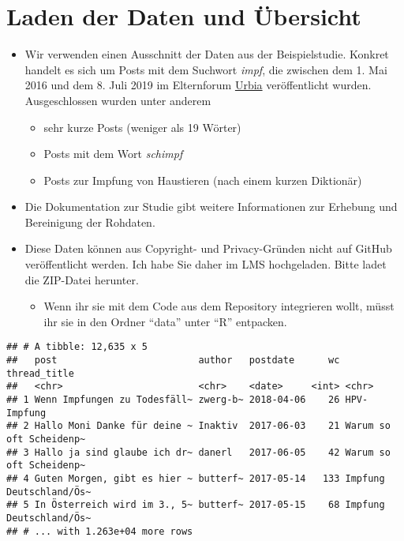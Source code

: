 \documentclass[
]{book}
\newenvironment{Shaded}{\begin{snugshade}}{\end{snugshade}}
\newcommand{\CommentTok}[1]{\textcolor[rgb]{0.56,0.35,0.01}{\textit{#1}}}
\newcommand{\DataTypeTok}[1]{\textcolor[rgb]{0.13,0.29,0.53}{#1}}
\newcommand{\DecValTok}[1]{\textcolor[rgb]{0.00,0.00,0.81}{#1}}
\newcommand{\KeywordTok}[1]{\textcolor[rgb]{0.13,0.29,0.53}{\textbf{#1}}}
\newcommand{\NormalTok}[1]{#1}
\newcommand{\OperatorTok}[1]{\textcolor[rgb]{0.81,0.36,0.00}{\textbf{#1}}}
\newcommand{\StringTok}[1]{\textcolor[rgb]{0.31,0.60,0.02}{#1}}
\providecommand{\tightlist}{%
  \setlength{\itemsep}{0pt}\setlength{\parskip}{0pt}}
\begin{document}
\hypertarget{laden-der-daten-und-uxfcbersicht}{%
\section{Laden der Daten und Übersicht}\label{laden-der-daten-und-uxfcbersicht}}

\begin{itemize}
\tightlist
\item
  Wir verwenden einen Ausschnitt der Daten aus der Beispielstudie. Konkret handelt es sich um Posts mit dem Suchwort \emph{impf}, die zwischen dem 1. Mai 2016 und dem 8. Juli 2019 im Elternforum \href{https://www.urbia.de/forum}{Urbia} veröffentlicht wurden. Ausgeschlossen wurden unter anderem

  \begin{itemize}
  \tightlist
  \item
    sehr kurze Posts (weniger als 19 Wörter)
  \item
    Posts mit dem Wort \emph{schimpf}
  \item
    Posts zur Impfung von Haustieren (nach einem kurzen Diktionär)
  \end{itemize}
\item
  Die Dokumentation zur Studie gibt weitere Informationen zur Erhebung und Bereinigung der Rohdaten.
\item
  Diese Daten können aus Copyright- und Privacy-Gründen nicht auf GitHub veröffentlicht werden. Ich habe Sie daher im LMS hochgeladen. Bitte ladet die ZIP-Datei herunter.

  \begin{itemize}
  \tightlist
  \item
    Wenn ihr sie mit dem Code aus dem Repository integrieren wollt, müsst ihr sie in den Ordner ``data'' unter ``R'' entpacken.
  \end{itemize}
\end{itemize}

\begin{Shaded}
\end{Shaded}

\begin{verbatim}
## # A tibble: 12,635 x 5
##   post                         author   postdate      wc thread_title           
##   <chr>                        <chr>    <date>     <int> <chr>                  
## 1 Wenn Impfungen zu Todesfäll~ zwerg-b~ 2018-04-06    26 HPV-Impfung            
## 2 Hallo Moni Danke für deine ~ Inaktiv  2017-06-03    21 Warum so oft Scheidenp~
## 3 Hallo ja sind glaube ich dr~ danerl   2017-06-05    42 Warum so oft Scheidenp~
## 4 Guten Morgen, gibt es hier ~ butterf~ 2017-05-14   133 Impfung Deutschland/Ös~
## 5 In Österreich wird im 3., 5~ butterf~ 2017-05-15    68 Impfung Deutschland/Ös~
## # ... with 1.263e+04 more rows
\end{verbatim}
\end{document}
